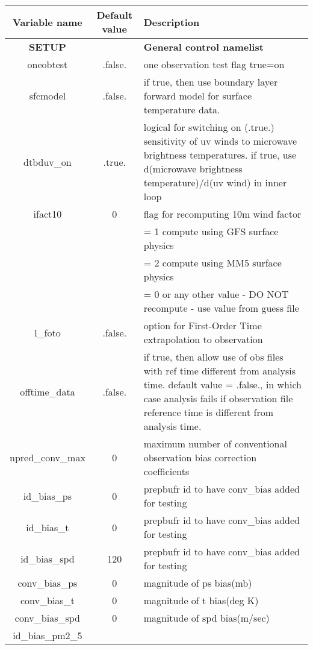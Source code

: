 \begin{table}[h]
 \footnotesize
 \center
 \begin{tabular}{| c | c | p{9cm} |}
 \hline
 Variable name & Default value & Description \\
 \hline
 \textbf{SETUP} &   & \textbf{General control namelist} \\
 \hline
   oneobtest & .false. & one observation  test flag true=on \\
  \hline
  sfcmodel & .false. & if true, then use boundary layer forward model for surface temperature data. \\
  \hline
  dtbduv\_on & .true. & logical for switching on (.true.) sensitivity of uv winds to microwave brightness temperatures.
  if true, use d(microwave brightness temperature)/d(uv wind) in inner loop \\
  \hline
  ifact10 & 0 & flag for recomputing 10m wind factor \\
            & & = 1 compute using GFS surface physics \\
            & & = 2 compute using MM5 surface physics \\
            & & = 0 or any other value - DO NOT recompute - use value from guess file \\
  \hline
  l\_foto & .false. & option for First-Order Time extrapolation to observation \\
\hline
  offtime\_data & .false. & if true, then allow use of obs files with ref time different from analysis time. default value = .false., in which case analysis fails if observation file reference time is different from analysis time. \\
  \hline
  npred\_conv\_max & 0 & maximum number of conventional  observation bias correction coefficients \\
  \hline
  id\_bias\_ps & 0 & prepbufr id to have conv\_bias added for testing \\
  \hline
  id\_bias\_t & 0 & prepbufr id to have conv\_bias added for testing \\
  \hline
  id\_bias\_spd	& 120 & prepbufr id to have conv\_bias added for testing \\
  \hline
  conv\_bias\_ps & 0 & magnitude of ps bias(mb) \\
  \hline
  conv\_bias\_t & 0	& magnitude of t  bias(deg K) \\
  \hline
  conv\_bias\_spd & 0 & magnitude of spd bias(m/sec) \\
  \hline
  id\_bias\_pm2\_5 & & \\

\end{tabular}
\end{table}
